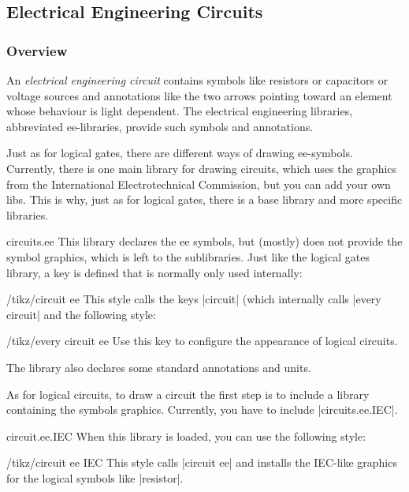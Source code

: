 \subsection{Electrical Engineering Circuits}

\subsubsection{Overview}

An \emph{electrical engineering circuit} contains symbols like
resistors or capacitors or voltage sources and annotations like the
two arrows pointing toward an element whose behaviour is light
dependent. The electrical engineering libraries, abbreviated
ee-libraries, provide such symbols and annotations.

Just as for logical gates, there are different ways of drawing
ee-symbols. Currently, there is one main library for drawing circuits,
which uses the graphics from the International Electrotechnical
Commission, but you can add your own libs. This is why, just as for
logical gates, there is a base library and more specific libraries.

\begin{tikzlibrary}{circuits.ee}
  This library declares the ee symbols, but (mostly) does not
  provide the symbol graphics, which is left to the sublibraries.
  Just like the logical gates library, a key is defined that is
  normally only used internally:
  \begin{key}{/tikz/circuit ee}
    This style calls the keys |circuit| (which internally calls
    |every circuit| and the following style:
    \begin{stylekey}{/tikz/every circuit ee}
      Use this key to configure the appearance of logical circuits.
    \end{stylekey}
  \end{key}

  The library also declares some standard annotations and units.
\end{tikzlibrary}

As for logical circuits, to draw a circuit the first step is to
include a library containing the symbols graphics. Currently, you have to
include |circuits.ee.IEC|.

\begin{tikzlibrary}{circuit.ee.IEC}
  When this library is loaded, you can use the following style:
  \begin{key}{/tikz/circuit ee IEC}
    This style calls |circuit ee| and installs the IEC-like
    graphics for the logical symbols like |resistor|.
  \end{key}
\end{tikzlibrary}

